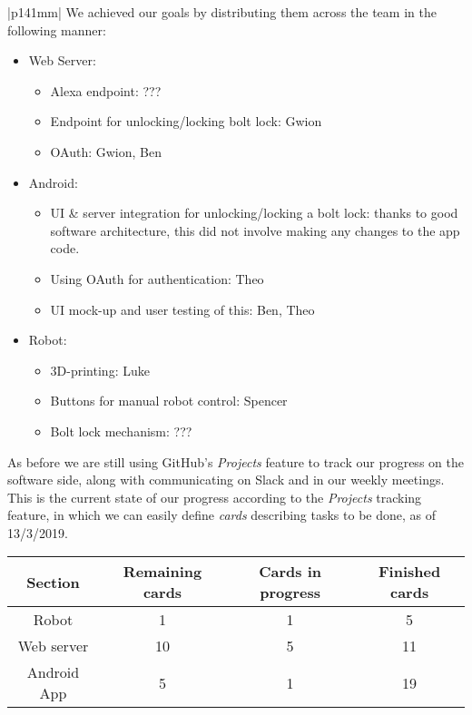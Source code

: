 \documentclass[a4paper]{article}
\newcommand{\colWidth}{141mm}
\begin{document}
\begin{center}
\begin{tabular}{|p{\colWidth}|}
		We achieved our goals by distributing them across the team in the following manner:
		\begin{itemize}
			\item Web Server:
				\begin{itemize}
					\item Alexa endpoint: {\color{red} ???}
					\item Endpoint for unlocking/locking bolt lock: Gwion
					\item OAuth: Gwion, Ben
				\end{itemize}
			\item Android:
				\begin{itemize}
					\item UI \& server integration for unlocking/locking a bolt lock: thanks to good software architecture, this did not involve making any changes to the app code.
					\item Using OAuth for authentication: Theo
					\item UI mock-up and user testing of this: Ben, Theo
				\end{itemize}
			\item Robot:
			\begin{itemize}
				\item 3D-printing: Luke
				\item Buttons for manual robot control: Spencer
				\item Bolt lock mechanism: {\color{red} ???}
			\end{itemize}
		\end{itemize}

		As before we are still using GitHub's \textit{Projects} feature to track our progress on the software side, along with communicating on Slack and in our weekly meetings.
		This is the current state of our progress according to the \textit{Projects} tracking feature, in which
		we can easily define \textit{cards} describing tasks to be done, as of 13/3/2019.
		
		\vspace{3mm}
		
		\begin{tabular}{| c || c | c | c |} \hline
			\textbf{Section} & \textbf{Remaining cards} & \textbf{Cards in progress} & \textbf{Finished cards}\\ \hline
			Robot & 1 & 1 & 5 \\
			Web server & 10 & 5 & 11 \\
			Android App & 5 & 1 & 19 \\ \hline
		\end{tabular}


\end{tabular}
\end{center}
\end{document}

